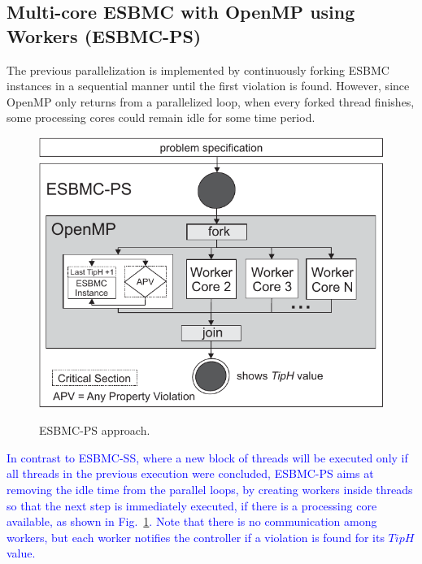 \documentclass{doublecol-new}
\theoremstyle{TH}{
\newtheorem{lemma}{Lemma}
\newtheorem{theorem}[lemma]{Theorem}
\newtheorem{corrolary}[lemma]{Corrolary}
\newtheorem{conjecture}[lemma]{Conjecture}
\newtheorem{proposition}[lemma]{Proposition}
\newtheorem{claim}[lemma]{Claim}
\newtheorem{stheorem}[lemma]{Wrong Theorem}
\newtheorem{algorithm}{Algorithm}
}
\theoremstyle{THrm}{
\newtheorem{definition}{Definition}[section]
\newtheorem{question}{Question}[section]
\newtheorem{remark}{Remark}
\newtheorem{scheme}{Scheme}
}
\theoremstyle{THhit}{
\newtheorem{case}{Case}[section]
}
\begin{document}
\subsection{Multi-core ESBMC with OpenMP using Workers (ESBMC-PS)}
\label{Multi-core-ESBMC-with-OpenMP-using-workers}

The previous parallelization is implemented by continuously forking ESBMC instances in a sequential manner until the first violation is found. However, since OpenMP only returns from a parallelized loop, when every forked thread finishes, some processing cores could remain idle for some time period.

\begin{figure}[h]
	\caption{ESBMC-PS approach.}
	\centering
	\includegraphics[scale=0.77]{figures/esbmc-ps.pdf} 	
	\label{ESBMC-Multi-core-Optimized-Sequential-Approach}
\end{figure}

\textcolor{blue}{In contrast to ESBMC-SS, where a new block of threads will be executed only if all threads in the previous execution were concluded, ESBMC-PS aims at removing the idle time from the parallel loops, by creating workers inside threads so that the next step is immediately executed, if there is a processing core available, as shown in Fig.~\ref{ESBMC-Multi-core-Optimized-Sequential-Approach}. Note that there is no communication among workers, but each worker notifies the controller if a violation is found for its $TipH$ value.}
\end{document}
